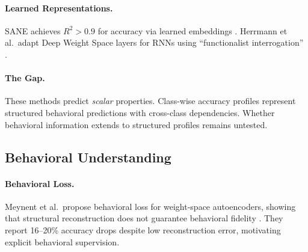\paragraph{Learned Representations.} SANE achieves $R^2 > 0.9$ for accuracy via learned embeddings \cite{schurholt2024sane}. Herrmann et al.\ adapt Deep Weight Space layers for RNNs using ``functionalist interrogation'' \cite{herrmann2024rnn}.

\paragraph{The Gap.} These methods predict \emph{scalar} properties. Class-wise accuracy profiles represent structured behavioral predictions with cross-class dependencies. Whether behavioral information extends to structured profiles remains untested.

\subsection{Behavioral Understanding}

\paragraph{Behavioral Loss.} Meynent et al.\ propose behavioral loss for weight-space autoencoders, showing that structural reconstruction does not guarantee behavioral fidelity \cite{meynent2025behavior}. They report 16--20\% accuracy drops despite low reconstruction error, motivating explicit behavioral supervision.
